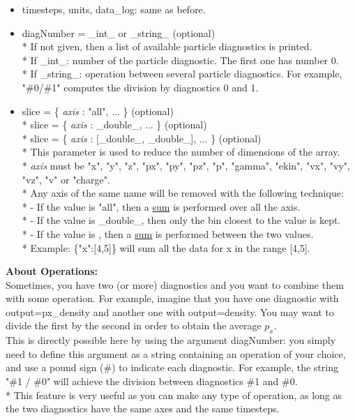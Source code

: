 \documentclass[11pt]{article}
\newcommand{\code}[1]{\colorbox{yellow!15}{\ttfamily #1}}
\newcommand{\val}[1]{{\ttfamily \textit{#1}}}
\begin{document}
\begin{itemize}
\item \code{timesteps}, \code{units}, \code{data\_log}: same as before.
\item \code{diagNumber} = \code{\_int\_} or  \code{\_string\_} (optional)\\*
	If not given, then a list of available particle diagnostics is printed.\\*
	If \code{\_int\_}: number of the particle diagnostic. The first one has number 0.\\*
	If \code{\_string\_}: operation between several particle diagnostics.
	For example, \code{"\#0/\#1"} computes the division by diagnostics 0 and 1.
\item \code{slice} = \code{\{ \val{axis} : "all", ... \}}                 (optional)\\*
	\code{slice} = \code{\{ \val{axis} : \_double\_, ... \}}              (optional)\\*
	\code{slice} = \code{\{ \val{axis} : [\_double\_, \_double\_], ... \}}  (optional)\\*
	This parameter is used to reduce the number of dimensions of the array.\\*
	\val{axis} must be \code{"x"}, \code{"y"}, \code{"z"}, \code{"px"}, \code{"py"}, \code{"pz"}, \code{"p"},
	 \code{"gamma"}, \code{"ekin"}, \code{"vx"}, \code{"vy"}, \code{"vz"}, \code{"v"} or \code{"charge"}.\\*
	 Any axis of the same name will be removed with the following technique:\\*
	- If the value is \code{"all"}, then a \underline{sum} is performed over all the axis.\\*
	- If the value is \code{\_double\_}, then only the bin closest to the value is kept.\\*
	- If the value is \code{[\_double\_,\_double\_]}, then a \underline{sum} is performed between the two values.\\*
	Example: \code{\{"x":[4,5]\}} will sum all the data for x in the range [4,5].
\end{itemize}
\vspace{0.5cm}

\textbf{About Operations:}\\
Sometimes, you have two (or more) diagnostics and you want to combine them with some operation.
For example, imagine that you have one diagnostic with \code{output=px\_density} and another one with \code{output=density}.
You may want to divide the first by the second in order to obtain the average $p_x$.\\
This is directly possible here by using the argument \code{diagNumber}: you simply need to define this argument
as a string containing an operation of your choice, and use a pound sign (\#) to indicate each diagnostic. For example,
the string \code{"\#1 / \#0"} will achieve the division between diagnostics \#1 and \#0.\\*
This feature is very useful as you can make any type of operation, as long as the two diagnostics have the same axes
and the same timesteps.\\
\end{document}
